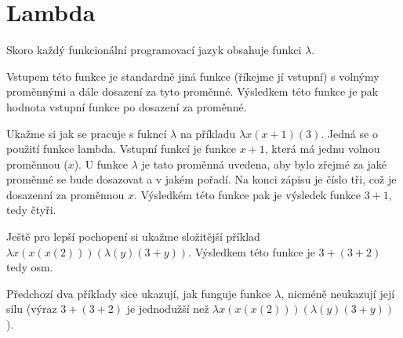 \author{Michal Kováč}


\section{Lambda}
Skoro každý funkcionální programovací jazyk obsahuje funkci $\lambda$.

Vstupem této funkce je standardně jiná funkce (říkejme jí vstupní) s volnýmy proměnnými a dále dosazení za tyto proměnné. Výsledkem této funkce je pak hodnota vstupní funkce po dosazení za proměnné.

Ukažme si jak se pracuje s fukncí $\lambda$ na příkladu $\lambda{x}(x+1)(3)$. Jedná se o použití funkce lambda. Vstupní funkcí je funkce $x+1$, která má jednu volnou proměnnou ($x$). U funkce $\lambda$ je tato proměnná uvedena, aby bylo zřejmé za jaké proměnné se bude dosazovat a v jakém pořadí. Na konci zápisu je číslo tři, což je dosazenní za proměnnou $x$. Výsledkém této funkce pak je výsledek funkce $3+1$, tedy čtyři.

Ještě pro lepší pochopení si ukažme složitější příklad $\lambda{x}(x(x(2)))(\lambda(y)(3+y))$. Výsledkem této funkce je $3+(3+2)$ tedy osm.

Předchozí dva příklady sice ukazují, jak funguje funkce $\lambda$, nicméně neukazují její sílu (výraz $3+(3+2)$ je jednodužší než $\lambda{x}(x(x(2)))(\lambda(y)(3+y))$). 

